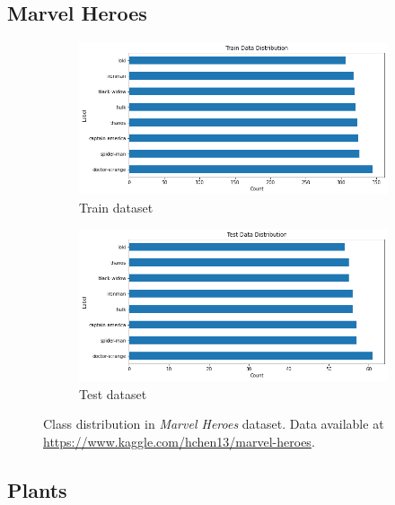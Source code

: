 \subsection{Marvel Heroes}\label{appendix:datasets:marvel}

\begin{figure}[hbt!]
  \centering
 \begin{subfigure}{.35\textwidth}
    \centering
    \includegraphics[width=\textwidth]{appendixes/images/marvel-train.png}
    \caption{Train dataset}
\end{subfigure}
 \begin{subfigure}{.35\textwidth}
    \centering
    \includegraphics[width=\textwidth]{appendixes/images/marvel-test.png}
    \caption{Test dataset}
\end{subfigure}

 \caption{Class distribution in \textit{Marvel Heroes}\cite{marvel-heroes} dataset. Data available at \url{https://www.kaggle.com/hchen13/marvel-heroes}.}
\end{figure}

\FloatBarrier

\subsection{Plants}\label{appendix:datasets:plants}

